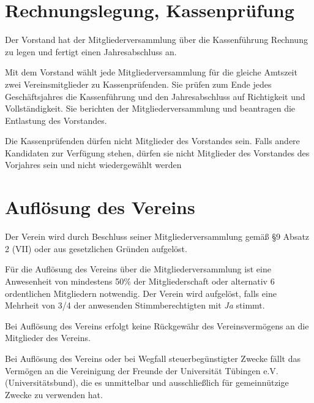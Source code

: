\section{Rechnungslegung, Kassenprüfung}
	\begin{myEnum}
		\item Der Vorstand hat der Mitgliederversammlung über die Kassenführung Rechnung zu legen und fertigt einen Jahresabschluss an.
		\item Mit dem Vorstand wählt jede Mitgliederversammlung für die gleiche Amtszeit zwei Vereinsmitglieder zu Kassenprüfenden. Sie prüfen zum Ende jedes Geschäftsjahres die Kassenführung und den Jahresabschluss	auf Richtigkeit und Vollständigkeit. Sie berichten der Mitgliederversammlung und beantragen die Entlastung des Vorstandes.
		\item Die Kassenprüfenden dürfen nicht Mitglieder des Vorstandes sein. Falls andere Kandidaten zur Verfügung stehen, dürfen sie nicht Mitglieder des Vorstandes des Vorjahres sein und nicht wiedergewählt werden
	\end{myEnum}
	
\section{Auflösung des Vereins}
	\begin{myEnum}
		\item Der Verein wird durch Beschluss seiner Mitgliederversammlung gemäß §9 Absatz 2 (VII) oder aus gesetzlichen Gründen aufgelöst. 
		\item Für die Auflösung des Vereins über die Mitgliederversammlung ist eine Anwesenheit von mindestens 50\% der Mitgliederschaft oder alternativ 6 ordentlichen Mitgliedern notwendig. Der Verein wird aufgelöst, falls eine Mehrheit von 3/4 der anwesenden Stimmberechtigten mit \textit{Ja} stimmt.
		\item Bei Auflösung des Vereins erfolgt keine Rückgewähr des Vereinsvermögens an die Mitglieder des Vereins.
		\item Bei Auflösung des Vereins oder bei Wegfall steuerbegünstigter Zwecke fällt das Vermögen an die Vereinigung der Freunde der Universität Tübingen e.V. (Universitätsbund), die es unmittelbar und ausschließlich für gemeinnützige Zwecke zu verwenden hat.
	\end{myEnum}
